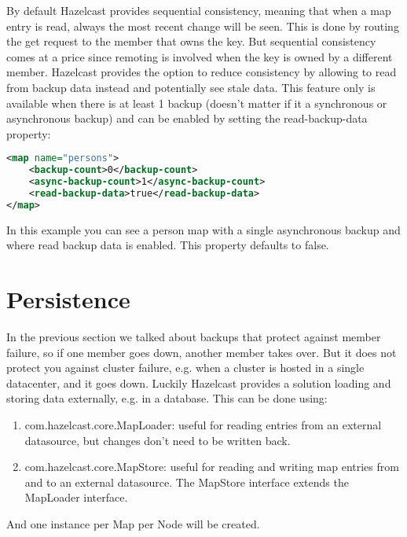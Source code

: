 By default Hazelcast provides sequential consistency, meaning that when a map entry is read, always the most recent change will be seen. This is done by routing the get request to the member that owns the key. But sequential consistency comes at a price since remoting is involved when the key is owned by a different member. Hazelcast provides the option to reduce consistency by allowing to read from backup data instead and potentially see stale data. This feature only is available when there is at least 1 backup (doesn't matter if it a synchronous or asynchronous backup) and can be enabled by setting the read-backup-data property:
\begin{lstlisting}[language=xml]
<map name="persons">
    <backup-count>0</backup-count>
    <async-backup-count>1</async-backup-count>
    <read-backup-data>true</read-backup-data>
</map>
\end{lstlisting}
In this example you can see a person map with a single asynchronous backup and where read backup data is enabled. This property defaults to false.

\section{Persistence}
In the previous section we talked about backups that protect against member failure, so if one member goes down, another member takes over. But it does not protect you against cluster failure, e.g. when a cluster is hosted in a single datacenter, and it goes down. Luckily Hazelcast provides a solution loading and storing data externally, e.g. in a database. This can be done using:
\begin{enumerate}
\item com.hazelcast.core.MapLoader: useful for reading entries from an external datasource, but changes don't need to be written back.
\item com.hazelcast.core.MapStore: useful for reading and writing map entries from and to an external datasource. The MapStore interface extends the MapLoader interface.
\end{enumerate}
And one instance per Map per Node will be created.

